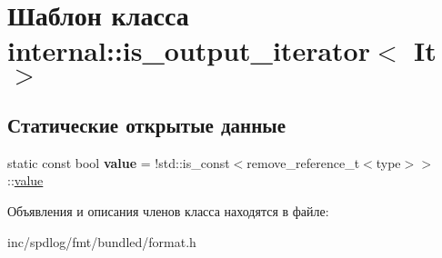 \hypertarget{classinternal_1_1is__output__iterator}{}\section{Шаблон класса internal\+:\+:is\+\_\+output\+\_\+iterator$<$ It $>$}
\label{classinternal_1_1is__output__iterator}
\subsection*{Статические открытые данные}
\begin{DoxyCompactItemize}
\item 
\mbox{\label{classinternal_1_1is__output__iterator_a2d666d72beb4bf14d00f2e5ecb1dd431}} 
static const bool {\bfseries value} = !std\+::is\+\_\+const$<$remove\+\_\+reference\+\_\+t$<$type$>$$>$\+::\hyperlink{classinternal_1_1value}{value}
\end{DoxyCompactItemize}


Объявления и описания членов класса находятся в файле\+:\begin{DoxyCompactItemize}
\item 
inc/spdlog/fmt/bundled/format.\+h\end{DoxyCompactItemize}
